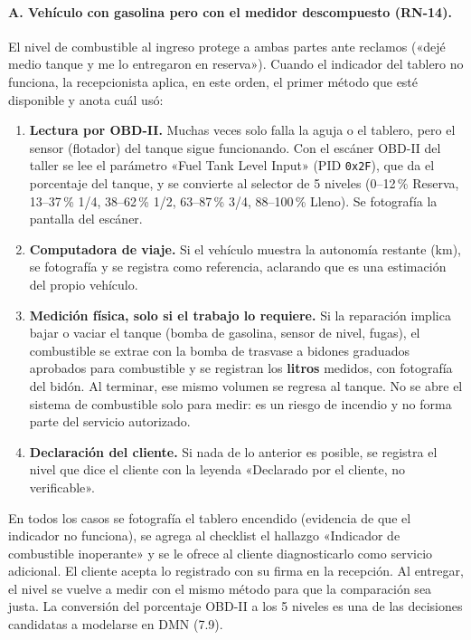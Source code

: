 \paragraph{A. Vehículo con gasolina pero con el medidor descompuesto
(RN-14).}

El nivel de combustible al ingreso protege a ambas partes ante reclamos
(«dejé medio tanque y me lo entregaron en reserva»). Cuando el indicador
del tablero no funciona, la recepcionista aplica, en este orden, el primer
método que esté disponible y anota cuál usó:

\begin{enumerate}
\tightlist
\item \textbf{Lectura por OBD-II.} Muchas veces solo falla la aguja o el
tablero, pero el sensor (flotador) del tanque sigue funcionando. Con el
escáner OBD-II del taller se lee el parámetro «Fuel Tank Level Input» (PID
\texttt{0x2F}), que da el porcentaje del tanque, y se convierte al selector
de 5 niveles (0--12\,\% Reserva, 13--37\,\% 1/4, 38--62\,\% 1/2,
63--87\,\% 3/4, 88--100\,\% Lleno). Se fotografía la pantalla del escáner.
\item \textbf{Computadora de viaje.} Si el vehículo muestra la autonomía
restante (km), se fotografía y se registra como referencia, aclarando que
es una estimación del propio vehículo.
\item \textbf{Medición física, solo si el trabajo lo requiere.} Si la
reparación implica bajar o vaciar el tanque (bomba de gasolina, sensor de
nivel, fugas), el combustible se extrae con la bomba de trasvase a bidones
graduados aprobados para combustible y se registran los \textbf{litros}
medidos, con fotografía del bidón. Al terminar, ese mismo volumen se
regresa al tanque. No se abre el sistema de combustible solo para medir:
es un riesgo de incendio y no forma parte del servicio autorizado.
\item \textbf{Declaración del cliente.} Si nada de lo anterior es posible,
se registra el nivel que dice el cliente con la leyenda «Declarado por el
cliente, no verificable».
\end{enumerate}

En todos los casos se fotografía el tablero encendido (evidencia de que el
indicador no funciona), se agrega al checklist el hallazgo «Indicador de
combustible inoperante» y se le ofrece al cliente diagnosticarlo como
servicio adicional. El cliente acepta lo registrado con su firma en la
recepción. Al entregar, el nivel se vuelve a medir con el mismo método para
que la comparación sea justa. La conversión del porcentaje OBD-II a los 5
niveles es una de las decisiones candidatas a modelarse en DMN (7.9).

